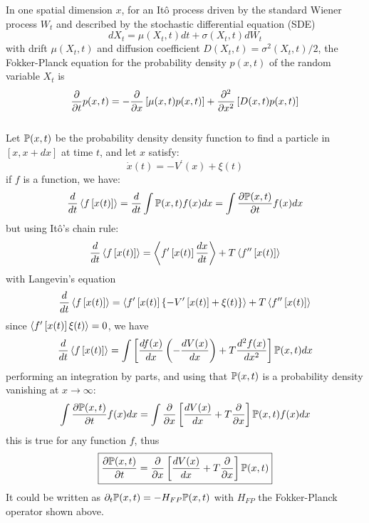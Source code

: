 \documentclass[books,12pt]{elegantpaper}
\begin{document}
 In one spatial dimension $x$, for an Itô process driven by the standard Wiener process $W_t$ and described by the stochastic differential equation (SDE)
$$ dX_t = \mu(X_t,t) dt + \sigma(X_t,t) dW_t $$
with drift $\mu(X_t,t)$ and diffusion coefficient $D(X_t,t) = \sigma^2(X_t,t)/2$, the Fokker-Planck equation for the probability density $p(x,t)$ of the random variable $X_t$ is
$$ \pder{t} p(x,t) = - \pder{x} \left[ \mu(x,t) p(x,t) \right] + \pdv[2]{}{x} \left[ D(x,t) p(x,t) \right] $$
\\
Let $\bb{P}(x,t)$ be the probability density density function to find a particle in $\left[x, x + dx\right]$ at time $t$, and let $x$ satisfy:
$$ \dot{x}(t) = -V^\prime(x) + \xi (t) $$
if $f$ is a function, we have:
$$ \frac{d}{dt} \llang f\left[ x(t) \right] \rrang = \frac{d}{dt} \int \bb{P}(x,t) f(x) dx = \int \pder[\bb{P}(x,t)]{t} f(x) dx $$
but using Itô's chain rule:
$$ \frac{d}{dt} \llang f\left[x(t)\right] \rrang = \llang f^\prime \left[ x(t) \right] \frac{dx}{dt} \rrang + T \llang f^{\prime\prime} \left[ x(t) \right] \rrang $$
with Langevin's equation
$$ \frac{d}{dt} \llang f\left[x(t)\right] \rrang = \llang f^\prime \left[ x(t) \right] \left\{ - V^\prime \left[ x(t) \right] + \xi(t) \right\} \rrang + T \llang f^{\prime\prime} \left[ x(t) \right] \rrang $$
since $\llang f^\prime \left[ x(t) \right] \xi(t) \rrang = 0$, we have
$$ \frac{d}{dt} \llang f \left[ x(t) \right] \rrang = \int \left[ \frac{df(x)}{dx} \left( - \frac{dV(x)}{dx} \right) + T \frac{d^2 f(x)}{dx^2} \right] \bb{P}(x,t) dx $$
performing an integration by parts, and using that $\bb{P}(x,t)$ is a probability density vanishing at $x\to\infty$:
$$ \int \pder[\bb{P}(x,t)]{t} f(x) dx = \int \pder{x} \left[ \frac{dV(x)}{dx} + T \pder{x} \right] \bb{P}(x,t) f(x) dx $$
this is true for any function $f$, thus
$$ \boxed{ \pder[\bb{P}(x,t)]{t} = \pder{x} \left[ \frac{dV(x)}{dx} + T \pder{x} \right] \bb{P}(x,t) } $$
It could be written as $\partial_t \bb{P}(x,t) = - H_{FP} \bb{P}(x,t)$ with $H_{FP}$ the Fokker-Planck operator shown above.





\label{ssc:Thomas}
\end{document}
